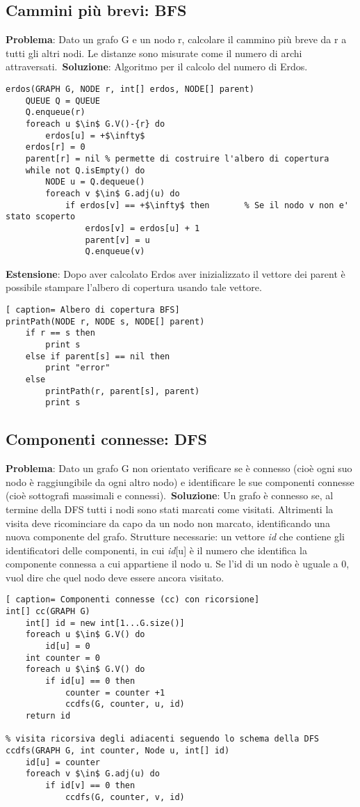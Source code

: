 \documentclass[../cheatSheetAlgoritmi.tex]{subfiles}
\begin{document}
\subsection{Cammini più brevi: BFS}
\textbf{Problema}: Dato un grafo G e un nodo r, calcolare il cammino più breve da r a tutti gli altri nodi. Le distanze sono misurate come il numero di archi attraversati.\
\textbf{Soluzione}: Algoritmo per il calcolo del numero di Erdos.\
\begin{lstlisting}[caption= Erdos]
erdos(GRAPH G, NODE r, int[] erdos, NODE[] parent)
	QUEUE Q = QUEUE
	Q.enqueue(r)
	foreach u $\in$ G.V()-{r} do
		erdos[u] = +$\infty$
	erdos[r] = 0
	parent[r] = nil % permette di costruire l'albero di copertura
	while not Q.isEmpty() do
		NODE u = Q.dequeue()
		foreach v $\in$ G.adj(u) do
			if erdos[v] == +$\infty$ then		% Se il nodo v non e' stato scoperto
				erdos[v] = erdos[u] + 1
				parent[v] = u
				Q.enqueue(v)
\end{lstlisting}

\textbf{Estensione}: Dopo aver calcolato Erdos aver inizializzato il vettore dei parent è possibile stampare l'albero di copertura usando tale vettore.\
\begin{lstlisting}[ caption= Albero di copertura BFS]
printPath(NODE r, NODE s, NODE[] parent)
	if r == s then
		print s
	else if parent[s] == nil then
		print "error"
	else
		printPath(r, parent[s], parent)
		print s
\end{lstlisting}

\subsection{Componenti connesse: DFS}
\textbf{Problema}: Dato un grafo G non orientato verificare se è connesso (cioè  ogni suo nodo è raggiungibile da ogni altro nodo) e identificare le sue componenti connesse (cioè sottografi massimali e connessi).\
\textbf{Soluzione}: Un grafo è connesso se, al termine della DFS tutti i nodi sono stati marcati come visitati. Altrimenti la visita deve ricominciare da capo da un nodo non marcato, identificando una nuova componente del grafo. Strutture necessarie: un vettore \textit{id} che contiene gli identificatori delle componenti, in cui \textit{id}[u] è il numero che identifica la componente connessa a cui appartiene il nodo u. Se l'id di un nodo è uguale a 0, vuol dire che quel nodo deve essere ancora visitato.\
\newpage
\begin{lstlisting}[ caption= Componenti connesse (cc) con ricorsione]
int[] cc(GRAPH G)
	int[] id = new int[1...G.size()]
	foreach u $\in$ G.V() do
		id[u] = 0
	int counter = 0
	foreach u $\in$ G.V() do
		if id[u] == 0 then
			counter = counter +1
			ccdfs(G, counter, u, id)
	return id

% visita ricorsiva degli adiacenti seguendo lo schema della DFS	
ccdfs(GRAPH G, int counter, Node u, int[] id)
	id[u] = counter
	foreach v $\in$ G.adj(u) do
		if id[v] == 0 then
			ccdfs(G, counter, v, id)
\end{lstlisting}
\end{document}
